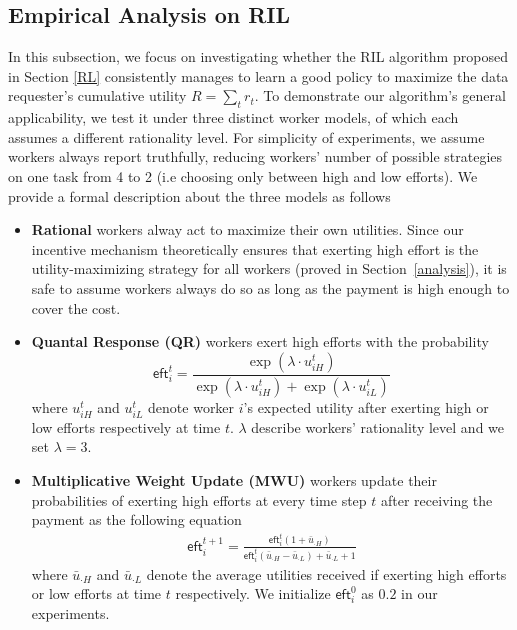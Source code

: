\subsection{Empirical Analysis on RIL}
In this subsection, we focus on investigating whether the RIL algorithm proposed in Section \ref{RL} consistently manages to learn a good policy to maximize the data requester's cumulative utility $R=\sum_t r_t$. To demonstrate our algorithm's general applicability, we test it under three distinct worker models, of which each assumes a different rationality level.
For simplicity of experiments, we assume workers always report truthfully,  reducing workers' number of possible strategies on one task from 4 to 2 (i.e choosing only between high and low efforts). 
We provide a formal description about the three models as follows
\begin{itemize}[topsep=0pt, partopsep=0pt]
\item {\bf Rational} workers alway act to maximize their own utilities. Since our incentive mechanism theoretically ensures that exerting high effort %
is the utility-maximizing strategy for all workers (proved in Section~\ref{analysis}), it is safe to assume workers always do so as long as the payment is high enough to cover the cost.
\item {\bf Quantal Response (QR)} workers \citep{mckelvey1995quantal} exert high efforts with the probability 
$$
\textsf{eft}_i^t= \frac{\exp(\lambda\cdot  u_{iH}^t)}{\exp(\lambda \cdot u_{iH}^t) + \exp (\lambda \cdot u_{iL}^t)}
$$
where $u_{iH}^t$ and $u_{iL}^t$ denote worker $i$'s expected utility after exerting high or low efforts respectively at time $t$. $\lambda$ describe workers' rationality level and we set $\lambda =3$.

\item {\bf Multiplicative Weight Update (MWU)} workers \citep{chastain2014algorithms} update their probabilities of exerting high efforts at every time step $t$ after receiving the payment as the following equation
\begin{align*}
\textsf{eft}_i^{t+1} = \frac{\textsf{eft}_i^t(1+\bar{u}_{\cdot H})}{\textsf{eft}_i^t(\bar{u}_{\cdot H} - \bar{u}_{\cdot L}) + \bar{u}_{\cdot L} + 1}
\end{align*}
where $\bar{u}_{\cdot H}$ and $\bar{u}_{\cdot L}$ denote the average utilities received if exerting high efforts or low efforts at time $t$ respectively. We initialize $\textsf{eft}_i^0$ as $0.2$ in our experiments.
\end{itemize}


